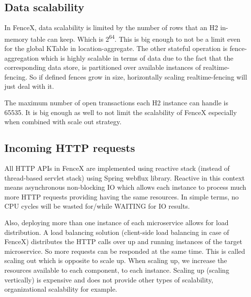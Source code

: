 \documentclass[a4]{report}
\begin{document}
    \subsection{Data scalability}
    In FenceX, data scalability is limited by the number of rows that an H2 in-memory table can keep.
    Which is 2\textsuperscript{64}.
    This is big enough to not be a limit even for the global KTable in location-aggregate.
    The other stateful operation is fence-aggregation which is highly scalable in terms of data due to the fact that the corresponding data store, is partitioned over available instances of realtime-fencing.
    So if defined fences grow in size, horizontally scaling realtime-fencing will just deal with it.

    The maximum number of open transactions each H2 instance can handle is 65535.
    It is big enough as well to not limit the scalability of FenceX especially when combined with scale out strategy.

    \subsection{Incoming HTTP requests}
    All HTTP APIs in FenceX are implemented using reactive stack (instead of thread-based servlet stack) using Spring
    webflux library.
    Reactive in this context means asynchronous non-blocking IO which allows each instance to process much more HTTP
    requests providing having the same resources.
    In simple terms, no CPU cycles will be wasted for/while WAITING for IO results.

    Also, deploying more than one instance of each microservice allows for load distribution.
    A load balancing solution (client-side load balancing in case of FenceX) distributes the HTTP calls over up and running instances of the target microservice.
    So more requests can be responded at the same time.
    This is called scaling out which is opposite to scale up.
    When scaling up, we increase the resources available to each component, to each instance.
    Scaling up (scaling vertically) is expensive and does not provide other types of scalability, organizational scalability for example.
\end{document}
